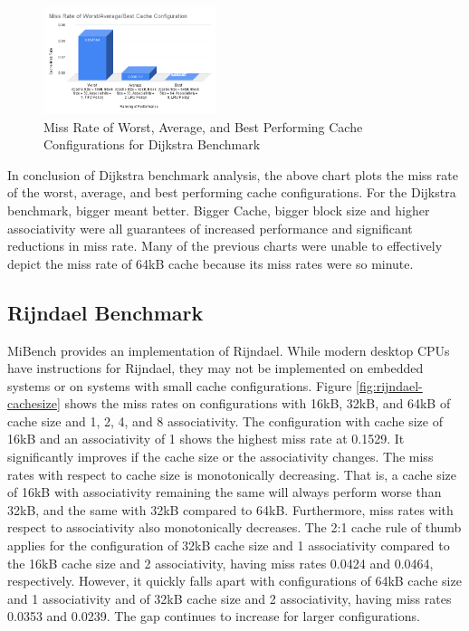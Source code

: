 \documentclass[conference]{IEEEtran}
\begin{document}
\begin{figure}[H]
  \centering
  \includegraphics[width=0.45\textwidth]{dijkstraFigures/MissRateofWorstAverageBestCacheConfiguration.png}
  \caption{Miss Rate of Worst, Average, and Best Performing Cache Configurations for Dijkstra Benchmark}
  \label{fig:WorstAvgBest}
\end{figure}

In conclusion of Dijkstra benchmark analysis, the above chart plots the miss rate of the worst, average, and best performing cache configurations. For the Dijkstra benchmark, bigger meant better. Bigger Cache, bigger block size and higher associativity were all guarantees of increased performance and significant reductions in miss rate. Many of the previous charts were unable to effectively depict the miss rate of 64kB cache because its miss rates were so minute.

\subsection{Rijndael Benchmark}

MiBench provides an implementation of Rijndael. While modern desktop CPUs have instructions for Rijndael\cite{gueron2010intel}, they may not be implemented on embedded systems or on systems with small cache configurations. Figure \ref{fig:rijndael-cachesize} shows the miss rates on configurations with 16kB, 32kB, and 64kB of cache size and 1, 2, 4, and 8 associativity. The configuration with cache size of 16kB and an associativity of 1 shows the highest miss rate at 0.1529. It significantly improves if the cache size or the associativity changes. The miss rates with respect to cache size is monotonically decreasing. That is, a cache size of 16kB with associativity remaining the same will always perform worse than 32kB, and the same with 32kB compared to 64kB. Furthermore, miss rates with respect to associativity also monotonically decreases. The 2:1 cache rule of thumb applies for the configuration of 32kB cache size and 1 associativity compared to the 16kB cache size and 2 associativity, having miss rates 0.0424 and 0.0464, respectively. However, it quickly falls apart with configurations of 64kB cache size and 1 associativity and of 32kB cache size and 2 associativity, having miss rates 0.0353 and 0.0239. The gap continues to increase for larger configurations.
\end{document}
